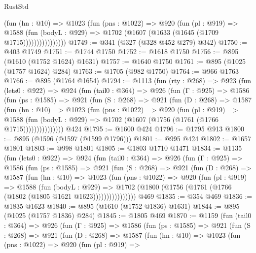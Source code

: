 \begin{lexlean}{RustStd}
\begin{coremodule}
                    (fun (hn : @10) =>
                    @1023
                      (fun (pns : @1022) =>
                      @920
                        (fun (pl : @919) =>
                        @1588
                          (fun (bodyL : @929) =>
                          @1702 (@1607 (@1633 (@1645 (@1709 @1715))))))))))))))))
@1749 := @341 (@327 (@328 @452 @279) @342)
@1750 := @403 @1749
@1751 := @1744 @1750
@1752 := @1618 @1750
@1756 := @895 (@1610 (@1752 @1624) @1631)
@1757 := @1640 @1750
@1761 := @895 (@1025 (@1757 @1624) @284)
@1763 := @1705 (@982 @1750)
@1764 := @966 @1763
@1766 := @895 (@1764 @1654)
@1794 := @1113
    (fun (rty : @268) =>
    @923
      (fun (lets0 : @922) =>
      @924
        (fun (tail0 : @364) =>
        @926
          (fun (Γ : @925) =>
          @1586
            (fun (ps : @1585) =>
            @921
              (fun (S : @268) =>
              @921
                (fun (D : @268) =>
                @1587
                  (fun (hn : @10) =>
                  @1023
                    (fun (pns : @1022) =>
                    @920
                      (fun (pl : @919) =>
                      @1588
                        (fun (bodyL : @929) =>
                        @1702 (@1607 (@1756 (@1761 (@1766 @1715)))))))))))))))
    @424
@1795 := @1600 @424
@1796 := @1795 @913
@1800 := @895 (@1596 (@1597 (@1599 @1796)))
@1801 := @995 @424
@1802 := @1657 @1801
@1803 := @998 @1801
@1805 := @1803 @1710 @1471
@1834 := @1135
    (fun (lets0 : @922) =>
    @924
      (fun (tail0 : @364) =>
      @926
        (fun (Γ : @925) =>
        @1586
          (fun (ps : @1585) =>
          @921
            (fun (S : @268) =>
            @921
              (fun (D : @268) =>
              @1587
                (fun (hn : @10) =>
                @1023
                  (fun (pns : @1022) =>
                  @920
                    (fun (pl : @919) =>
                    @1588
                      (fun (bodyL : @929) =>
                      @1702 (@1800 (@1756 (@1761 (@1766 (@1802 (@1805 @1621 @1623))))))))))))))))
    @469
@1835 := @354 @469
@1836 := @1835 @1623
@1840 := @895 (@1610 (@1752 @1836) @1631)
@1844 := @895 (@1025 (@1757 @1836) @284)
@1845 := @1805 @469
@1870 := @1159
    (fun (tail0 : @364) =>
    @926
      (fun (Γ : @925) =>
      @1586
        (fun (ps : @1585) =>
        @921
          (fun (S : @268) =>
          @921
            (fun (D : @268) =>
            @1587
              (fun (hn : @10) =>
              @1023
                (fun (pns : @1022) =>
                @920
                  (fun (pl : @919) =>

\end{coremodule}
\end{lexlean}
